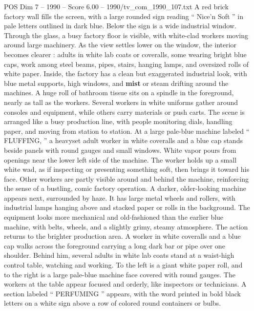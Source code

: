 \begin{textsample}{POS Dim 7 – 1990 – Score 6.00 – 1990/tv\_com\_1990\_107.txt}  \label{ex:f7_pos_067}
A red brick factory wall fills the screen, with a large rounded sign reading “ Nice’n Soft ” in pale letters outlined in dark blue.
Below the sign is a wide industrial window.
Through the glass, a busy factory floor is visible, with white-clad workers moving around large machinery.
As the view settles lower on the window, the interior becomes clearer : adults in white lab coats or coveralls, some wearing bright blue caps, work among steel beams, pipes, stairs, hanging lamps, and oversized rolls of white paper.
Inside, the factory has a clean but exaggerated industrial look, with blue metal supports, high windows, and \textbf{mist} or steam drifting around the machines.
A huge roll of bathroom tissue sits on a spindle in the foreground, nearly as tall as the workers.
Several workers in white uniforms gather around consoles and equipment, while others carry materials or push carts.
The scene is arranged like a busy production line, with people monitoring dials, handling paper, and moving from station to station.
At a large pale-blue machine labeled “ FLUFFING, ” a heavyset adult worker in white coveralls and a blue cap stands beside panels with round gauges and small windows.
White vapor pours from openings near the lower left side of the machine.
The worker holds up a small white wad, as if inspecting or presenting something soft, then brings it toward his face.
Other workers are partly visible around and behind the machine, reinforcing the sense of a bustling, comic factory operation.
A darker, older-looking machine appears next, surrounded by haze.
It has large metal wheels and rollers, with industrial lamps hanging above and stacked paper or rolls in the background.
The equipment looks more mechanical and old-fashioned than the earlier blue machine, with belts, wheels, and a slightly grimy, steamy atmosphere.
The action returns to the brighter production area.
A worker in white coveralls and a blue cap walks across the foreground carrying a long dark bar or pipe over one shoulder.
Behind him, several adults in white lab coats stand at a waist-high control table, watching and working.
To the left is a giant white paper roll, and to the right is a large pale-blue machine face covered with round gauges.
The workers at the table appear focused and orderly, like inspectors or technicians.
A section labeled “ PERFUMING ” appears, with the word printed in bold black letters on a white sign above a row of colored round containers or bulbs.

\end{textsample}
